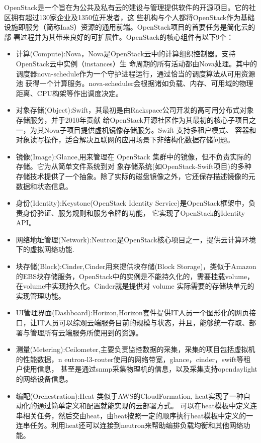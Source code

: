 OpenStack是一个旨在为公共及私有云的建设与管理提供软件的开源项目。它的社区拥有超过130家企业及1350位开发者，这
些机构与个人都将OpenStack作为基础设施即服务（简称IaaS）资源的通用前端。OpenStack项目的首要任务是简化云的部
署过程并为其带来良好的可扩展性。OpenStack的核心组件有以下9个：
\begin{itemize}
\item 计算(Compute):Nova，Nova是OpenStack云中的计算组织控制器。支持OpenStack云中实例（instances）生
命周期的所有活动都由Nova处理。其中的调度器nova-schedule作为一个守护进程运行，通过恰当的调度算法从可用资源池
获得一个计算服务。nova-scheduler会根据诸如负载、内存、可用域的物理距离、CPU构架等作出调度决定。
\item 对象存储(Object):Swift，其最初是由Rackspace公司开发的高可用分布式对象存储服务，并于2010年贡献
给OpenStack开源社区作为其最初的核心子项目之一，为其Nova子项目提供虚机镜像存储服务。Swift 支持多租户模式、
容器和对象读写操作，适合解决互联网的应用场景下非结构化数据存储问题。
\item 镜像(Image):Glance,用来管理在 OpenStack 集群中的镜像，但不负责实际的存储。它为从简单文件系统到对
象存储系统(如OpenStack-Swift项目)的多种存储技术提供了一个抽象。除了实际的磁盘镜像之外，它还保存描述镜像的元数据和状态信息。
\item 身份(Identity):Keystone(OpenStack Identity Service)是OpenStack框架中，负责身份验证、服务规则和服务令牌的功能， 它实现了OpenStack的Identity API。
\item 网络地址管理(Network):Neutron是OpenStack核心项目之一，提供云计算环境下的虚拟网络功能.
\item 块存储(Block):Cinder,Cinder用来提供块存储(Block Storage)，类似于Amazon的EBS块存储服务，OpenStack中的实例是不能持久化的，需要挂载volume，在volume中实现持久化。Cinder就是提供对 volume 实际需要的存储块单元的实现管理功能。
\item UI管理界面(Dashboard):Horizon,Horizon套件提供IT人员一个图形化的网页接口，让IT人员可以综观云端服务目前的规模与状态，并且，能够统一存取、部署与管理所有云端服务所使用到的资源。
\item 测量(Metering):Ceilometer,主要负责监控数据的采集，采集的项目包括虚拟机的性能数据，n
eutron-l3-router使用的网络带宽，glance，cinder，swift等租户使用信息，
甚至是通过snmp采集物理机的信息，以及采集支持opendaylight的网络设备信息。
\item 编配(Orchestration):Heat 类似于AWS的CloudFormation, heat实现了一种自动化的通过简单定义和配置就能实现的云部署方式。
可以在heat模板中定义连串相关任务，然后交由heat，由heat按照一定的顺序执行heat模板中定义的一连串任务。利用heat还可以连接到neutron来帮助编排负载均衡和其他网络功能。
\end{itemize}
